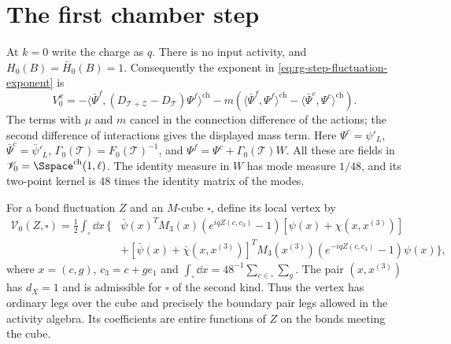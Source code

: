 \section{The first chamber step}\label{subsec:rg-step-first-vertex}

At $k=0$ write the charge as $q$.
There is no input activity, and $H_0(B)=\bar H_0(B)=1$.
Consequently the exponent in
\eqref{eq:rg-step-fluctuation-exponent} is
\begin{equation}\label{eq:rg-step-first-exponent}
 V_0^x=
  -\langle\bar\Psi^f,(D_{\mathscr T+\mathscr Z}
                                    -D_{\mathscr T})\Psi^f\rangle^{\mathrm{ch}}
  -m\left(\langle\bar\Psi^f,\Psi^f\rangle^{\mathrm{ch}}
                   -\langle\bar\Psi^c,\Psi^c\rangle^{\mathrm{ch}}\right).
\end{equation}
The terms with $\mu$ and $m$ cancel in the connection
difference of the actions; the second difference
of interactions gives the displayed mass term.
Here $\Psi^c=\psi'_L$, $\bar\Psi^c=\bar\psi'_L$,
$\Gamma_0(\mathscr T)=F_0(\mathscr T)^{-1}$,
and $\Psi^f=\Psi^c+\Gamma_0(\mathscr T)W$.
All these are fields in $\mathscr V_0=\Sspace^{\mathrm{ch}}(1,\ell)$.
The identity measure in $W$ has mode measure $1/48$,
and its two-point kernel is $48$ times the identity
matrix of the modes.

For a bond fluctuation $Z$ and an $M$-cube $\square$,
define its local vertex by
\begin{equation}\label{eq:rg-step-first-vertex}
 \begin{split}
 \mathcal V_0(Z,\square)=\frac12\int_\square\dd x\,
   \Big\{&
    \bar\psi(x)^TM_3(x)(e^{iqZ(c,c_3)}-1)
                                  [\psi(x)+\chi(x,x^{(3)})]\\
    &+[\bar\psi(x)+\bar\chi(x,x^{(3)})]^T
               M_3(x^{(3)})(e^{-iqZ(c,c_3)}-1)\psi(x)\Big\},
 \end{split}
\end{equation}
where $x=(c,g)$, $c_3=c+ge_1$ and
$\int_\square\dd x=48^{-1}\sum_{c\in\square}\sum_g$.
The pair $(x,x^{(3)})$ has $d_X=1$ and is admissible
for $\square$ of the second kind. Thus the vertex
has ordinary legs over the cube and precisely the
boundary pair legs allowed in the activity algebra.
Its coefficients are entire functions of $Z$ on
the bonds meeting the cube.

